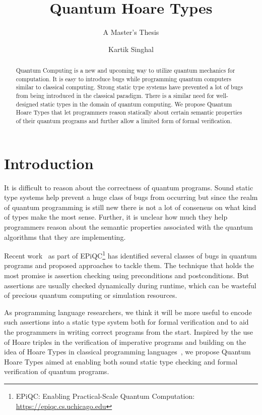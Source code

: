 \documentclass[acmsmall,nonacm,timestamp]{acmart}
\title{Quantum Hoare Types}
\subtitle{A Master's Thesis}
\author{Kartik Singhal}
\affiliation{
	\position{PhD Student}
	\department{Department of Computer Science}
	\institution{University of Chicago}
	\state{IL}
	\country{USA}}
\begin{document}
\begin{abstract}
Quantum Computing is a new and upcoming way to utilize quantum mechanics for computation. It is easy to introduce bugs while programming quantum computers similar to classical computing. Strong static type systems have prevented a lot of bugs from being introduced in the classical paradigm. There is a similar need for well-designed static types in the domain of quantum computing. We propose Quantum Hoare Types that let programmers reason statically about certain semantic properties of their quantum programs and further allow a limited form of formal verification.
\end{abstract}

\maketitle

\renewcommand*\contentsname{Table of Contents}
\tableofcontents

\listoffigures

\newpage

\section{Introduction}
It is difficult to reason about the correctness of quantum programs. Sound static type systems help prevent a huge class of bugs from occurring but since the realm of quantum programming is still new there is not a lot of consensus on what kind of types make the most sense. Further, it is unclear how much they help programmers reason about the semantic properties associated with the quantum algorithms that they are implementing.

Recent work~\cite{huang_qdb:_2018,huang_statistical_2019} as part of EPiQC\footnote{EPiQC: Enabling Practical-Scale Quantum Computation:  \url{https://epiqc.cs.uchicago.edu}} has identified several classes of bugs in quantum programs and proposed approaches to tackle them. The technique that holds the most promise is assertion checking using preconditions and postconditions. But assertions are usually checked dynamically during runtime, which can be wasteful of precious quantum computing or simulation resources.

As programming language researchers, we think it will be more useful to encode such assertions into a static type system both for formal verification and to aid the programmers in writing correct programs from the start. Inspired by the use of Hoare triples in the verification of imperative programs and building on the idea of Hoare Types in classical programming languages~\cite{nanevski_hoare_2008}, we propose Quantum Hoare Types aimed at enabling both sound static type checking and formal verification of quantum programs.
\end{document}
